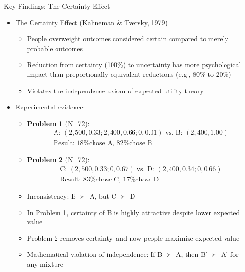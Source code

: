 \documentclass[10pt,handout]{beamer}
\begin{document}
\begin{frame}{Key Findings: The Certainty Effect}
  \begin{itemize}[<+->]
    \item The Certainty Effect (Kahneman \& Tversky, 1979)
      \begin{itemize}
        \item People overweight outcomes considered certain compared to merely probable outcomes
        \item Reduction from certainty (100\%) to uncertainty has more psychological impact than proportionally equivalent reductions (e.g., 80\% to 20\%)
        \item Violates the independence axiom of expected utility theory
      \end{itemize}
    \item Experimental evidence:
      \begin{itemize}
        \item \textbf{Problem 1} (N=72):
          \begin{align*}
            &\text{A: } (2,500, 0.33; 2,400, 0.66; 0, 0.01) \text{ vs. B: } (2,400, 1.00)\\
            &\text{Result: 18\% chose A, 82\% chose B}
          \end{align*}
        \item \textbf{Problem 2} (N=72):
          \begin{align*}
            &\text{C: } (2,500, 0.33; 0, 0.67) \text{ vs. D: } (2,400, 0.34; 0, 0.66)\\
            &\text{Result: 83\% chose C, 17\% chose D}
          \end{align*}
        \item Inconsistency: B $\succ$ A, but C $\succ$ D
        \item In Problem 1, certainty of B is highly attractive despite lower expected value
        \item Problem 2 removes certainty, and now people maximize expected value
        \item Mathematical violation of independence: If B $\succ$ A, then B' $\succ$ A' for any mixture
      \end{itemize}
  \end{itemize}
\end{frame}
\end{document}
